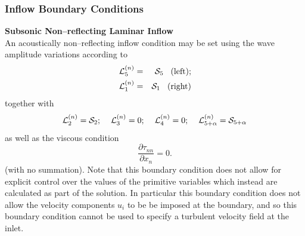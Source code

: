 \documentclass[dvips]{article}
\begin{document}
\subsubsection{Inflow Boundary Conditions}

{\bf Subsonic Non--reflecting Laminar Inflow}\\
An acoustically non--reflecting inflow condition may be
set using the wave amplitude variations according to
\begin{eqnarray}
{\mathcal L}_{5}^{(n)} & = & {\mathcal S}_{5}\hspace{3mm}{\rm (left);}
\nonumber \\
{\mathcal L}_{1}^{(n)} & = & {\mathcal S}_{1}\hspace{3mm}{\rm (right)}
\end{eqnarray}
together with
\begin{equation}
{\mathcal L}_{2}^{(n)} = {\mathcal S}_{2};\hspace{4mm}
{\mathcal L}_{3}^{(n)} = 0;\hspace{4mm}
{\mathcal L}_{4}^{(n)} = 0;\hspace{4mm}
{\mathcal L}_{5+\alpha}^{(n)} = {\mathcal S}_{5+\alpha}
\end{equation}
as well as the viscous condition
\begin{equation}
\frac{\partial \tau_{nn}}{\partial x_{n}} = 0.
\end{equation}
(with no summation).
Note that this boundary condition does not allow for explicit control
over the values of the primitive variables which instead are calculated
as part of the solution.  In particular this boundary condition does not
allow the velocity components $u_{i}$ to be be imposed at the boundary,
and so this boundary
condition cannot be used to specify a turbulent velocity field at the inlet.
\end{document}
